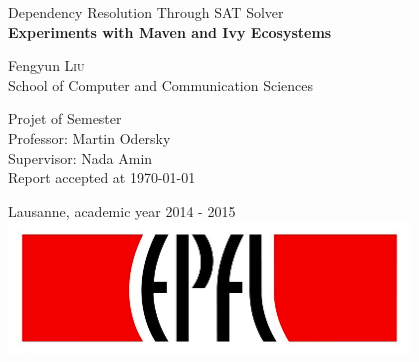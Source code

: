 \begin{titlepage}

  \begin{center}

    \vspace*{3\baselineskip}
    {\Large Dependency Resolution Through SAT Solver \\[0.4cm] }
    {\bfseries Experiments with Maven and Ivy Ecosystems\\[1.5cm] }

    \noindent
    Fengyun \textsc{Liu} \\[0.3cm]

    \noindent
    {School of Computer and Communication Sciences \\[2cm]}

    \begin{framed}
    Projet of Semester \\
    Professor: Martin Odersky \\
    Supervisor: Nada Amin \\
    Report accepted at \today
    \end{framed}

    \noindent
    Lausanne, academic year 2014 - 2015 \\[1cm]

    \includegraphics[width=0.8\textwidth]{img/epfl}~\\[1cm]



  \end{center}

\end{titlepage}
